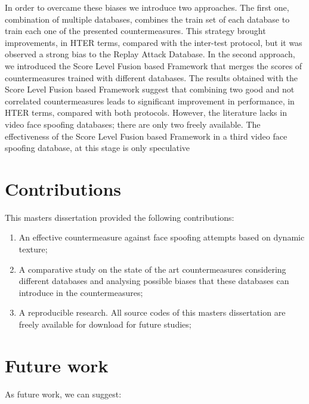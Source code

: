 In order to overcame these biases we introduce two approaches. The first one, combination of multiple databases, combines the train set of each database to train each one of the presented countermeasures. This strategy brought improvements, in HTER terms, compared with the inter-test protocol, but it was observed a strong bias to the Replay Attack Database. In the second approach, we introduced the Score Level Fusion based Framework that merges the scores of countermeasures trained with different databases. The results obtained with the Score Level Fusion based Framework suggest that combining two good and not correlated countermeasures leads to significant improvement in performance, in HTER terms, compared with both protocols. However, the literature lacks in video face spoofing databases; there are only two freely available. The effectiveness of the Score Level Fusion based Framework in a third video face spoofing database, at this stage is only speculative

\section{Contributions}

This masters dissertation provided the following contributions:

\begin{enumerate}
	\item An effective countermeasure against face spoofing attempts based on dynamic texture; 
	\item A comparative study on the state of the art countermeasures considering different databases and analysing possible biases that these databases can introduce in the countermeasures;
	\item A reproducible research. All source codes of this masters dissertation are freely available for download for future studies;
\end{enumerate}


\section{Future work}

As future work, we can suggest:

